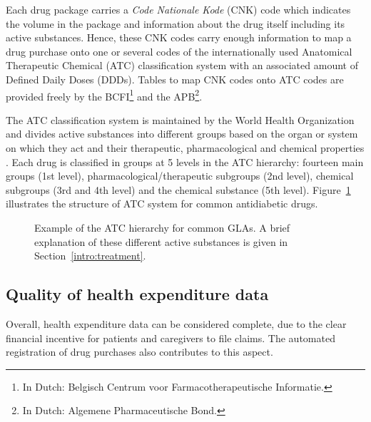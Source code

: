 Each drug package carries a \emph{Code Nationale Kode} (CNK) code which indicates the volume in the package and information about the drug itself including its active substances. Hence, these CNK codes carry enough information to map a drug purchase onto one or several codes of the internationally used Anatomical Therapeutic Chemical (ATC) classification system with an associated amount of Defined Daily Doses (DDDs). Tables to map CNK codes onto ATC codes are provided freely by the BCFI\footnote{In Dutch: Belgisch Centrum voor Farmacotherapeutische Informatie.} and the APB\footnote{In Dutch: Algemene Pharmaceutische Bond.}.

The ATC classification system is maintained by the World Health Organization and divides active substances into different groups based on the organ or system on which they act and their therapeutic, pharmacological and chemical properties \citep{world1996guidelines}. Each drug is classified in groups at 5 levels in the ATC hierarchy: fourteen main groups (1st level), pharmacological/therapeutic subgroups (2nd level), chemical subgroups (3rd and 4th level) and the chemical substance (5th level). Figure~\ref{intro:atc-example} illustrates the structure of ATC system for common antidiabetic drugs.

\begin{figure}[!h]
\caption{Example of the ATC hierarchy for common GLAs. A brief explanation of these different active substances is given in Section~\ref{intro:treatment}.} \label{intro:atc-example}
\end{figure}


\subsection{Quality of health expenditure data} \label{cmdata-quality}
Overall, health expenditure data can be considered complete, due to the clear financial incentive for patients and caregivers to file claims. The automated registration of drug purchases also contributes to this aspect.

